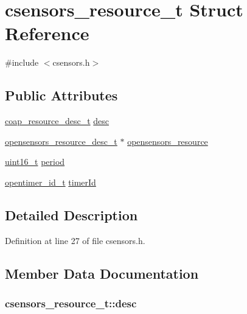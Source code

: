 \hypertarget{structcsensors__resource__t}{}\section{csensors\+\_\+resource\+\_\+t Struct Reference}
\label{structcsensors__resource__t}


{\ttfamily \#include $<$csensors.\+h$>$}

\subsection*{Public Attributes}
\begin{DoxyCompactItemize}
\item 
\hyperlink{structcoap__resource__desc__t}{coap\+\_\+resource\+\_\+desc\+\_\+t} \hyperlink{structcsensors__resource__t_a5264ea87c6050b9ae152d7d965f806c4}{desc}
\item 
\hyperlink{structopensensors__resource__desc__t}{opensensors\+\_\+resource\+\_\+desc\+\_\+t} $\ast$ \hyperlink{structcsensors__resource__t_ac08b388304f99deeac3dd9e15208e49d}{opensensors\+\_\+resource}
\item 
\hyperlink{_p_e___types_8h_a1f1825b69244eb3ad2c7165ddc99c956}{uint16\+\_\+t} \hyperlink{structcsensors__resource__t_abd80c8fcc840aee4f62109a4000217e9}{period}
\item 
\hyperlink{group___open_timers_gae5ca9e65d270cdfa4bc74008d96d69ab}{opentimer\+\_\+id\+\_\+t} \hyperlink{structcsensors__resource__t_a2b3abfe0ef080bec23a310f228a06003}{timer\+Id}
\end{DoxyCompactItemize}


\subsection{Detailed Description}


Definition at line 27 of file csensors.\+h.



\subsection{Member Data Documentation}
\subsubsection[{\texorpdfstring{desc}{desc}}]{ csensors\+\_\+resource\+\_\+t\+::desc}\hypertarget{structcsensors__resource__t_a5264ea87c6050b9ae152d7d965f806c4}{}\label{structcsensors__resource__t_a5264ea87c6050b9ae152d7d965f806c4}


